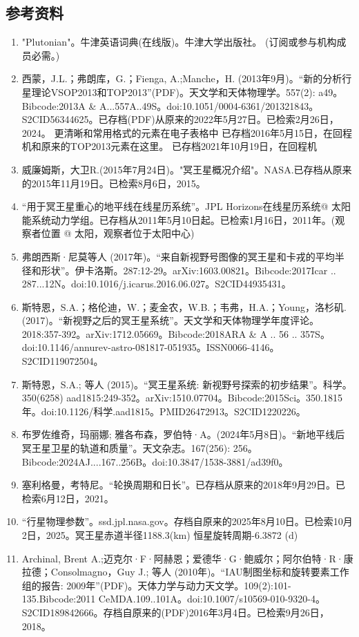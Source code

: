 \subsection{参考资料}
\begin{enumerate}
\item "Plutonian"。牛津英语词典(在线版)。牛津大学出版社。 (订阅或参与机构成员必需。)
\item 西蒙，J.L.；弗朗库，G.；Fienga, A.;Manche，H. (2013年9月)。“新的分析行星理论VSOP2013和TOP2013”(PDF)。天文学和天体物理学。557(2): a49。Bibcode:2013A & A...557A..49S。doi:10.1051/0004-6361/201321843。S2CID56344625。已存档(PDF)从原来的2022年5月27日。已检索2月26日，2024。   更清晰和常用格式的元素在电子表格中 已存档2016年5月15日，在回程机和原来的TOP2013元素在这里。 已存档2021年10月19日，在回程机
\item 威廉姆斯，大卫R.(2015年7月24日)。"冥王星概况介绍"。NASA.已存档从原来的2015年11月19日。已检索8月6日，2015。
\item “用于冥王星重心的地平线在线星历系统”。JPL Horizons在线星历系统@ 太阳能系统动力学组。已存档从2011年5月10日起。已检索1月16日，2011年。(观察者位置 @ 太阳，观察者位于太阳中心)
\item 弗朗西斯·尼莫等人 (2017年)。“来自新视野号图像的冥王星和卡戎的平均半径和形状”。伊卡洛斯。287:12-29。arXiv:1603.00821。Bibcode:2017Icar .. 287...12N。doi:10.1016/j.icarus.2016.06.027。S2CID44935431。 
\item 斯特恩，S.A.；格伦迪，W.；麦金农，W.B.；韦弗，H.A.；Young，洛杉矶.(2017)。“新视野之后的冥王星系统”。天文学和天体物理学年度评论。2018:357-392。arXiv:1712.05669。Bibcode:2018ARA & A .. 56 .. 357S。doi:10.1146/annurev-astro-081817-051935。ISSN0066-4146。S2CID119072504。  
\item 斯特恩，S.A.; 等人 (2015)。“冥王星系统: 新视野号探索的初步结果”。科学。350(6258) aad1815:249-352。arXiv:1510.07704。Bibcode:2015Sci。350.1815年。doi:10.1126/科学.aad1815。PMID26472913。S2CID1220226。  
\item 布罗佐维奇，玛丽娜; 雅各布森，罗伯特·A。(2024年5月8日)。“新地平线后冥王星卫星的轨道和质量”。天文杂志。167(256): 256。Bibcode:2024AJ....167..256B。doi:10.3847/1538-3881/ad39f0。
\item 塞利格曼，考特尼。“轮换周期和日长”。已存档从原来的2018年9月29日。已检索6月12日，2021。
\item “行星物理参数”。ssd.jpl.nasa.gov。存档自原来的2025年8月10日。已检索10月2日，2025。冥王星赤道半径1188.3(km) 恒星旋转周期-6.3872 (d)
\item Archinal, Brent A.;迈克尔·F·阿赫恩；爱德华·G·鲍威尔；阿尔伯特·R·康拉德；Consolmagno，Guy J.; 等人 (2010年)。“IAU制图坐标和旋转要素工作组的报告: 2009年”(PDF)。天体力学与动力天文学。109(2):101-135.Bibcode:2011 CeMDA.109..101A。doi:10.1007/s10569-010-9320-4。S2CID189842666。存档自原来的(PDF)2016年3月4日。已检索9月26日，2018。  

\end{enumerate}
